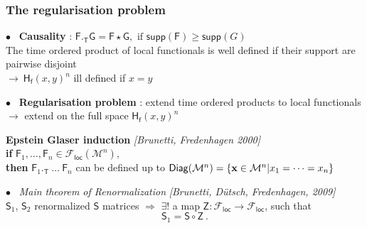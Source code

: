 \documentclass[9pt]{beamer}
\newcommand{\supp}{\mathsf{supp}} %
\newcommand{\citebeam}[1]{\textit{\textcolor{black!60!white}{[#1]}}} %
\newcommand{\Fcal}{\mathcal{F}}
\newcommand{\Mcal}{\mathcal{M}}
\newcommand{\Fsf}{\mathsf{F}}
\newcommand{\Gsf}{\mathsf{G}}
\newcommand{\Hsf}{\mathsf{H}}
\newcommand{\Ssf}{\mathsf{S}}
\newcommand{\Tsf}{\mathsf{T}}
\newcommand{\Zsf}{\mathsf{Z}}
\newcommand{\fsf}{\mathsf{f}}
\begin{document}
\begin{frame}

\frametitle{The regularisation problem}

\vfill

$\bullet$ \ \textbf{Causality} : \quad $\Fsf ._\Tsf \Gsf = \Fsf \star \Gsf, \mbox{ if } \supp(\Fsf) \geq \supp(G)$ \\
\hspace*{8pt} The time ordered product of local functionals is well defined if their support \hspace*{8pt} are pairwise disjoint \\

\hspace*{8pt} $\to \ \Hsf_\fsf(x,y)^n$  ill defined if $x=y$ \\

\vfill 

$\bullet$ \ \textbf{Regularisation problem} : extend time ordered products to local functionals \\
\hspace*{8pt} $\to$ extend on the full space $\Hsf_\fsf(x,y)^n$

\vspace*{-6pt}

\begin{block}{}
\vspace*{-2ex}
\textbf{Epstein Glaser induction} \citebeam{Brunetti, Fredenhagen 2000}  \\
\textbf{if} $\Fsf_1, \dots, \Fsf_n \in \Fcal_\mathsf{loc}(\Mcal^n)$, \\
\textbf{then} $\Fsf_1 ._\Tsf \ \dots \ \Fsf_n$ can be defined up to $\mathsf{Diag}(\Mcal^n)=\{{\bf x}\in \Mcal^n  | x_1 = \dots = x_n\}$ \\[5pt]
\vspace*{-1ex}
\end{block}

\vfill

$\bullet$ \ \textit{Main theorem of Renormalization} \citebeam{Brunetti, Dütsch, Fredenhagen, 2009}\\
\hspace*{8pt} $\Ssf_1$, $\Ssf_2$ renormalized $\Ssf$ matrices $\Rightarrow$ $\exists!$ a map $\Zsf : \Fcal_\mathsf{loc} \to \Fcal_\mathsf{loc}$, such that 
\vspace*{-9pt}
\begin{equation*}
\Ssf_1 = \Ssf \circ \Zsf \ .
\end{equation*}

\vfill

\end{frame}
\end{document}
